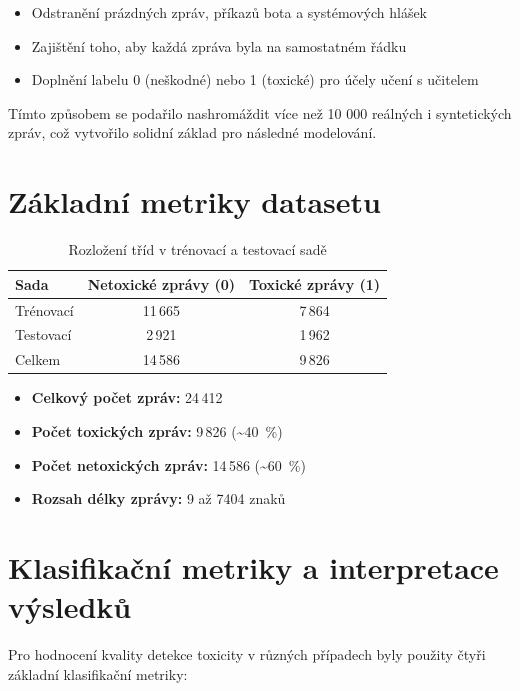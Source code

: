 \documentclass[FM,Proj]{tulthesis}
\begin{document}
\begin{itemize}
    \item Odstranění prázdných zpráv, příkazů bota a systémových hlášek
    \item Zajištění toho, aby každá zpráva byla na samostatném řádku
    \item Doplnění labelu 0 (neškodné) nebo 1 (toxické) pro účely učení s učitelem
\end{itemize}

Tímto způsobem se podařilo nashromáždit více než 10 000 reálných i syntetických zpráv, což vytvořilo solidní základ pro následné modelování.

\section{Základní metriky datasetu}
\label{sec:dataset-metrics}

\begin{table}[H]
\centering
\caption{Rozložení tříd v trénovací a testovací sadě}
\begin{tabular}{lcc}
\hline
\textbf{Sada} & \textbf{Netoxické zprávy (0)} & \textbf{Toxické zprávy (1)} \\
\hline
Trénovací     & 11\,665 & 7\,864 \\
Testovací     & 2\,921 & 1\,962 \\
\hline
Celkem        & 14\,586 & 9\,826 \\
\hline
\end{tabular}
\label{tab:dataset-split}
\end{table}

\begin{itemize}
    \item \textbf{Celkový počet zpráv:} 24\,412
    \item \textbf{Počet toxických zpráv:} 9\,826 (\textasciitilde 40~\%)
    \item \textbf{Počet netoxických zpráv:} 14\,586 (\textasciitilde 60~\%)
    \item \textbf{Rozsah délky zprávy:} 9 až 7404 znaků
\end{itemize}

\section{Klasifikační metriky a interpretace výsledků}

Pro hodnocení kvality detekce toxicity v různých případech byly použity čtyři základní klasifikační metriky:
\end{document}

